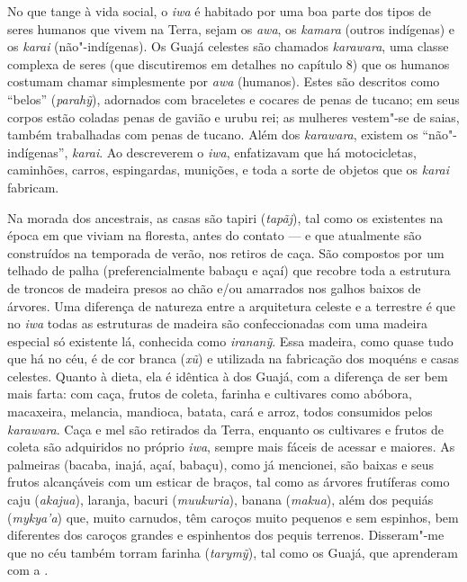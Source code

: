 No que tange à vida social, o \emph{iwa} é habitado por uma boa parte
dos tipos de seres humanos que vivem na Terra, sejam os \emph{awa}, os
\emph{kamara} (outros indígenas) e os \emph{karai} (não"-indígenas). Os
Guajá celestes são chamados \emph{karawara}, uma classe complexa de
seres (que discutiremos em detalhes no capítulo 8) que os humanos
costumam chamar simplesmente por \emph{awa} (humanos). Estes são
descritos como ``belos'' (\emph{parahỹ}), adornados com braceletes e
cocares de penas de tucano; em seus corpos estão coladas penas de gavião
e urubu rei; as mulheres vestem"-se de saias, também trabalhadas com
penas de tucano. Além dos \emph{karawara}, existem os ``não"-indígenas'',
\emph{karai}. Ao descreverem o \emph{iwa}, enfatizavam que há
motocicletas, caminhões, carros, espingardas, munições, e toda a sorte
de objetos que os \emph{karai} fabricam.

Na morada dos ancestrais, as casas são tapiri (\emph{tapãj}), tal como
os existentes na época em que viviam na floresta, antes do contato --- e
que atualmente são construídos na temporada de verão, nos retiros de
caça. São compostos por um telhado de palha (preferencialmente babaçu e
açaí) que recobre toda a estrutura de troncos de madeira presos ao chão
e/ou amarrados nos galhos baixos de árvores. Uma diferença de natureza
entre a arquitetura celeste e a terrestre é que no \emph{iwa} todas as
estruturas de madeira são confeccionadas com uma madeira especial só
existente lá, conhecida como \emph{irananỹ}. Essa madeira, como quase
tudo que há no céu, é de cor branca (\emph{xũ}) e utilizada na
fabricação dos moquéns e casas celestes. Quanto à dieta, ela é idêntica
à dos Guajá, com a diferença de ser bem mais farta: com caça, frutos de
coleta, farinha e cultivares como abóbora, macaxeira, melancia,
mandioca, batata, cará e arroz, todos consumidos pelos \emph{karawara}.
Caça e mel são retirados da Terra, enquanto os cultivares e frutos de
coleta são adquiridos no próprio \emph{iwa}, sempre mais fáceis de
acessar e maiores. As palmeiras (bacaba, inajá, açaí, babaçu), como já
mencionei, são baixas e seus frutos alcançáveis com um esticar de
braços, tal como as árvores frutíferas como caju (\emph{akajua}),
laranja, bacuri (\emph{muukuria}), banana (\emph{makua}), além dos
pequiás (\emph{mykya'a}) que, muito carnudos, têm caroços muito pequenos
e sem espinhos, bem diferentes dos caroços grandes e espinhentos dos
pequis terrenos. Disseram"-me que no céu também torram farinha
(\emph{tarymỹ}), tal como os Guajá, que aprenderam com a .

